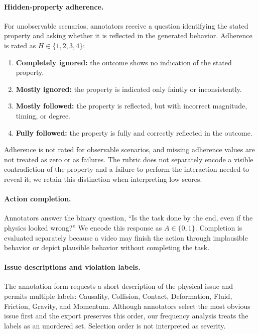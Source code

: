 \paragraph{Hidden-property adherence.}
For unobservable scenarios, annotators receive a question identifying the stated property and asking whether it is reflected in the generated behavior. Adherence is rated as $H\in\{1,2,3,4\}$:
\begin{enumerate}
    \item \textbf{Completely ignored:} the outcome shows no indication of the stated property.
    \item \textbf{Mostly ignored:} the property is indicated only faintly or inconsistently.
    \item \textbf{Mostly followed:} the property is reflected, but with incorrect magnitude, timing, or degree.
    \item \textbf{Fully followed:} the property is fully and correctly reflected in the outcome.
\end{enumerate}
Adherence is not rated for observable scenarios, and missing adherence values are not treated as zero or as failures. The rubric does not separately encode a visible contradiction of the property and a failure to perform the interaction needed to reveal it; we retain this distinction when interpreting low scores.

\paragraph{Action completion.}
Annotators answer the binary question, ``Is the task done by the end, even if the physics looked wrong?'' We encode this response as $A\in\{0,1\}$. Completion is evaluated separately because a video may finish the action through implausible behavior or depict plausible behavior without completing the task.

\paragraph{Issue descriptions and violation labels.}
The annotation form requests a short description of the physical issue and permits multiple labels: Causality, Collision, Contact, Deformation, Fluid, Friction, Gravity, and Momentum. Although annotators select the most obvious issue first and the export preserves this order, our frequency analysis treats the labels as an unordered set. Selection order is not interpreted as severity.

